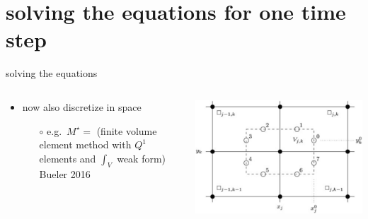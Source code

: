 \documentclass[hide notes,intlimits,usenames,dvipsnames]{beamer}
\begin{document}
\section{solving the equations for one time step}

\begin{frame}{solving the equations}
\begin{columns}
\begin{column}{0.55\textwidth}
\begin{itemize}
\item now also discretize in space
    \begin{itemize}
    \item[$\circ$] e.g.~$M^\star=$ (finite volume element method with $Q^1$ elements and $\int_V$ weak form) \hfill \tiny  Bueler 2016
    \end{itemize}
\end{itemize}
\end{column}
\begin{column}{0.45\textwidth}
\bigskip

\includegraphics[width=\textwidth]{mstarstencil.png} 
\end{column}
\end{columns}


\end{frame}
\end{document}
